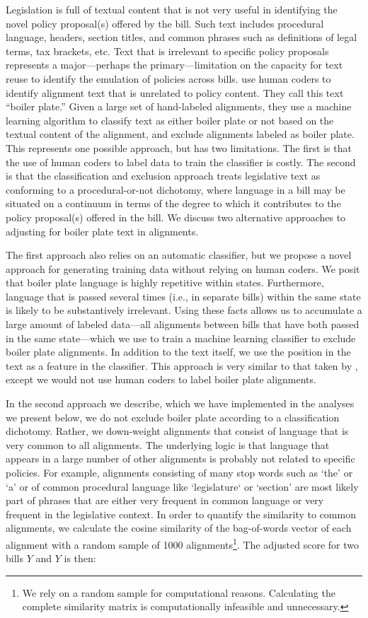 \documentclass[12pt]{article} %
\begin{document}
Legislation is full of textual content that is not very useful in identifying the novel policy proposal(s) offered by the bill. Such text includes procedural language, headers, section titles, and common phrases such as definitions of legal terms, tax brackets, etc. Text that is irrelevant to specific policy proposals represents a major---perhaps the primary---limitation on the capacity for text reuse to identify the emulation of policies across bills. \citet{wilkerson2015tracing} use human coders to identify alignment text that is unrelated to policy content. They call this text ``boiler plate.'' Given a large set of hand-labeled alignments, they use a machine learning algorithm to classify text as either boiler plate or not based on the textual content of the alignment, and exclude alignments labeled as boiler plate. This represents one possible approach, but has two limitations. The first is that the use of human coders to label data to train the classifier is costly. The second is that the classification and exclusion approach treats legislative text as conforming to a procedural-or-not dichotomy, where language in a bill may be situated on a continuum in terms of the degree to which it contributes to the policy proposal(s) offered in the bill. We discuss two alternative approaches to adjusting for boiler plate text in alignments.

The first approach also relies on an automatic classifier, but we propose a novel approach for
generating training data without relying on human coders. We posit that boiler plate language is highly repetitive within states. Furthermore, language
that is passed several times (i.e., in separate bills) within the same state is likely to be
substantively irrelevant. Using these facts allows us to accumulate a large amount of labeled data---all alignments between bills that have both passed in the same state---which we use to train a machine learning classifier to exclude boiler plate alignments. In addition to the text
itself, we use the position in the text as a feature in the classifier. This approach is very similar to that taken by \citet{wilkerson2015tracing}, except we would not use human coders to label boiler plate alignments.

In the second approach we describe, which we have implemented in the analyses we present below, we do not exclude boiler plate according to a classification dichotomy.
Rather, we down-weight alignments that consist of language that is
very common to all alignments. The underlying logic is that language that
appears in a large number of other alignments is probably not related to
specific policies. For example, alignments consisting of many stop words such as
`the' or `a' or of common procedural language like `legislature` or `section'
are most likely part of phrases that are either very frequent in common language
or very frequent in the legislative context. 
In order to quantify the similarity to common alignments, we calculate the
cosine similarity of the bag-of-words vector of each alignment with a random
sample of 1000 alignments\footnote{We rely on a random sample for computational
reasons. Calculating the complete similarity matrix is computationally
infeasible and unnecessary.}. The adjusted score for two bills $Y$ and $Y$ is
then:
\end{document}
